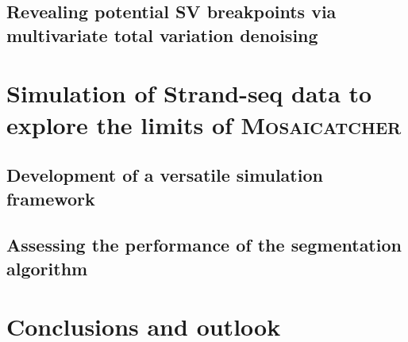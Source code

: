 \subsection{Revealing potential SV breakpoints via multivariate total variation denoising}
\label{sec:mosaic_segmentation}




\FloatBarrier
\section{Simulation of Strand-seq data to explore the limits of \textsc{Mosaicatcher}}
\label{sec:mosaic_simul}

\subsection{Development of a versatile simulation framework}

\subsection{Assessing the performance of the segmentation algorithm}

\section{Conclusions and outlook}
\label{sec:mosaic_conclusion}



